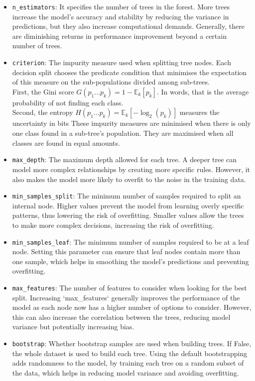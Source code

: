 \documentclass[twocolumn]{article}
\begin{document}
\begin{itemize}
    \item \texttt{n\_estimators}: It specifies the number of trees in the forest. More trees increase the model's accuracy and stability by reducing the variance in predictions, but they also increase computational demands. Generally, there are diminishing returns in performance improvement beyond a certain number of trees.

    \item \texttt{criterion}: The impurity measure used when splitting tree nodes. Each decision split chooses the predicate condition that minimises the expectation of this measure on the sub-populations divided among sub-trees. \\
    First, the Gini score \( \displaystyle G(p_1 \dots p_k) = 1 - \mathbb{E}_k[p_k]\). In words, that is the average probability of not finding each class. \\
    Second, the entropy \(\displaystyle H(p_1 \dots p_k) = \mathbb{E}_k[-\log_2 (p_k)]\) measures the uncertainty in bits 
    These impurity measures are minimised when there is only one class found in a sub-tree's population. They are maximised when all classes are found in equal amounts.

    \item \texttt{max\_depth}: The maximum depth allowed for each tree. A deeper tree can model more complex relationships by creating more specific rules. However, it also makes the model more likely to overfit to the noise in the training data.

    \item \texttt{min\_samples\_split}: The minimum number of samples required to split an internal node. Higher values prevent the model from learning overly specific patterns, thus lowering the risk of overfitting. Smaller values allow the trees to make more complex decisions, increasing the risk of overfitting.

    \item \texttt{min\_samples\_leaf}: The minimum number of samples required to be at a leaf node. Setting this parameter can ensure that leaf nodes contain more than one sample, which helps in smoothing the model's predictions and preventing overfitting.

    \item \texttt{max\_features}: The number of features to consider when looking for the best split. Increasing `max\_features` generally improves the performance of the model as each node now has a higher number of options to consider. However, this can also increase the correlation between the trees, reducing model variance but potentially increasing bias.

    \item \texttt{bootstrap}: Whether bootstrap samples are used when building trees. If False, the whole dataset is used to build each tree. Using the default bootstrapping adds randomness to the model, by training each tree on a random subset of the data, which helps in reducing model variance and avoiding overfitting.
    
\end{itemize}
\end{document}

